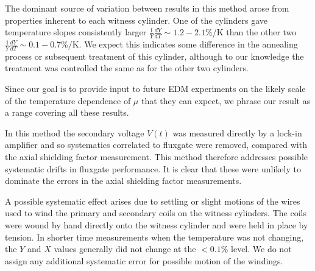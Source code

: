 


The dominant source of variation between results in this method arose
from properties inherent to each witness cylinder.  One of the
cylinders gave temperature slopes consistently larger
$\frac{1}{Y}\frac{dY}{dT}\sim 1.2-2.1$\%/K than the other two
$\frac{1}{Y}\frac{dY}{dT}\sim 0.1-0.7$\%/K.  We expect this indicates
some difference in the annealing process or subsequent treatment of
this cylinder, although to our knowledge the treatment was controlled
the same as for the other two cylinders.

Since our goal is to provide input to future EDM experiments on the
likely scale of the temperature dependence of $\mu$ that they can
expect, we phrase our result as a range covering all these results.

In this method the secondary voltage $V(t)$ was measured directly by a
lock-in amplifier and so systematics correlated to fluxgate were
removed, compared with the axial shielding factor measurement.  This
method therefore addresses possible systematic drifts in fluxgate
performance.  It is clear that these were unlikely to dominate the
errors in the axial shielding factor measurements.


A possible systematic effect arises due to settling or slight motions
of the wires used to wind the primary and secondary coils on the
witness cylinders.  The coils were wound by hand directly onto the
witness cylinder and were held in place by tension.
In shorter time measurements when the temperature was not changing,
the $Y$ and $X$ values generally did not change at the $<0.1\%$ level.
We do not assign any additional systematic error for possible motion
of the windings.

